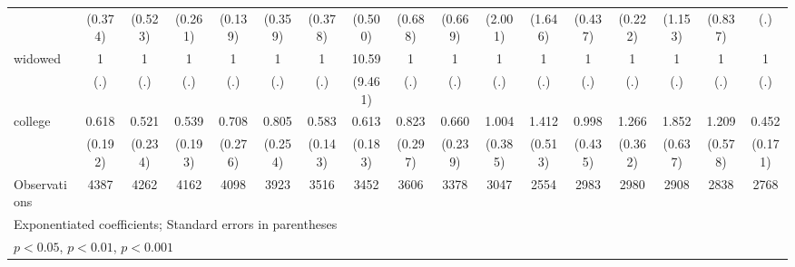 {\begin{tabular}{l*{16}{c}}
                    &     (0.374)         &     (0.523)         &     (0.261)         &     (0.139)         &     (0.359)         &     (0.378)         &     (0.500)         &     (0.688)         &     (0.669)         &     (2.001)         &     (1.646)         &     (0.437)         &     (0.222)         &     (1.153)         &     (0.837)         &         (.)         \\
[1em]
widowed             &           1         &           1         &           1         &           1         &           1         &           1         &       10.59\sym{**} &           1         &           1         &           1         &           1         &           1         &           1         &           1         &           1         &           1         \\
                    &         (.)         &         (.)         &         (.)         &         (.)         &         (.)         &         (.)         &     (9.461)         &         (.)         &         (.)         &         (.)         &         (.)         &         (.)         &         (.)         &         (.)         &         (.)         &         (.)         \\
[1em]
college             &       0.618         &       0.521         &       0.539         &       0.708         &       0.805         &       0.583\sym{*}  &       0.613         &       0.823         &       0.660         &       1.004         &       1.412         &       0.998         &       1.266         &       1.852         &       1.209         &       0.452\sym{*}  \\
                    &     (0.192)         &     (0.234)         &     (0.193)         &     (0.276)         &     (0.254)         &     (0.143)         &     (0.183)         &     (0.297)         &     (0.239)         &     (0.385)         &     (0.513)         &     (0.435)         &     (0.362)         &     (0.637)         &     (0.578)         &     (0.171)         \\
\hline
Observations        &        4387         &        4262         &        4162         &        4098         &        3923         &        3516         &        3452         &        3606         &        3378         &        3047         &        2554         &        2983         &        2980         &        2908         &        2838         &        2768         \\
\hline\hline
\multicolumn{17}{l}{\footnotesize Exponentiated coefficients; Standard errors in parentheses}\\
\multicolumn{17}{l}{\footnotesize \sym{*} \(p<0.05\), \sym{**} \(p<0.01\), \sym{***} \(p<0.001\)}\\
\end{tabular}
}
